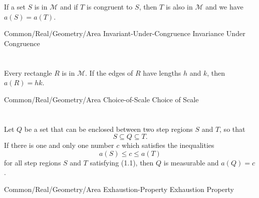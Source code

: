 \documentclass{article}
\newcommand{\link}[2]{\lean{../..}
  {Common/Real/Geometry/Area} %
  {#1} %
  {#2} %
}
\begin{document}
If a set $S$ is in $\mathscr{M}$ and if $T$ is congruent to $S$, then $T$ is
  also in $\mathscr{M}$ and we have $a(S) = a(T)$.

\begin{axiom}

  \link{Invariant-Under-Congruence}{Invariance Under Congruence}

\end{axiom}

\section*{}%
\label{sec:choice-scale}

Every rectangle $R$ is in $\mathscr{M}$.
If the edges of $R$ have lengths $h$ and $k$, then $a(R) = hk$.

\begin{axiom}

  \link{Choice-of-Scale}{Choice of Scale}

\end{axiom}

\section*{}%
%

Let $Q$ be a set that can be enclosed between two step regions $S$ and $T$, so
  that
  \begin{equation}
    \label{sec:exhaustion-property-eq1}
    S \subseteq Q \subseteq T.
  \end{equation}
If there is one and only one number $c$ which satisfies the inequalities
  $$a(S) \leq c \leq a(T)$$ for all step regions $S$ and $T$ satisfying (1.1),
  then $Q$ is measurable and $a(Q) = c$.

\begin{axiom}

  \link{Exhaustion-Property}{Exhaustion Property}

\end{axiom}
\end{document}
